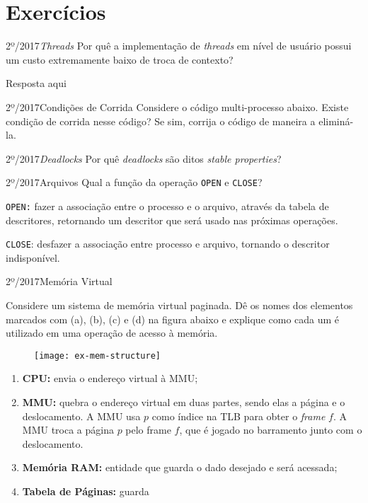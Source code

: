 \chapter{Exercícios}

\begin{exercicio}
  {2º/2017}{\textit{Threads}}
  {Por quê a implementação de \textit{threads} em nível de usuário possui um custo extremamente baixo de troca de contexto?}

  Resposta aqui
\end{exercicio}

\begin{exercicio}
  {2º/2017}{Condições de Corrida}
  {Considere o código multi-processo abaixo. Existe condição de corrida nesse código? Se sim, corrija o código de maneira a eliminá-la.}


\end{exercicio}

\begin{exercicio}
  {2º/2017}{\textit{Deadlocks}}
  {Por quê \textit{deadlocks} são ditos \textit{stable properties}?}


\end{exercicio}

\begin{exercicio}
  {2º/2017}{Arquivos}
  {Qual a função da operação \texttt{OPEN} e \texttt{CLOSE}?}

  \texttt{OPEN:} fazer a associação entre o processo e o arquivo, através da tabela de descritores, retornando um descritor que será usado nas próximas operações.

  \texttt{CLOSE}: desfazer a associação entre processo e arquivo, tornando o descritor indisponível.
\end{exercicio}

\begin{exercicio}
  {2º/2017}{Memória Virtual}
  {
    Considere um sistema de memória virtual paginada. Dê os nomes dos elementos marcados com (a), (b), (c) e (d) na figura abaixo e explique como cada um é utilizado em uma operação de acesso à memória.
    \begin{figure}
      \centering
      \texttt{[image: ex-mem-structure]}
    \end{figure}
  }

  \begin{enumerate}[label=(\alph*)]
    \item \textbf{CPU:} envia o endereço virtual à MMU;

    \item \textbf{MMU:} quebra o endereço virtual em duas partes, sendo elas a página e o deslocamento. A MMU usa $p$ como índice na TLB para obter o \textit{frame} $f$. A MMU troca a página $p$ pelo frame $f$, que é jogado no barramento junto com o deslocamento.

    \item \textbf{Memória RAM:} entidade que guarda o dado desejado e será acessada;

    \item \textbf{Tabela de Páginas:} guarda %
  \end{enumerate}
\end{exercicio}


